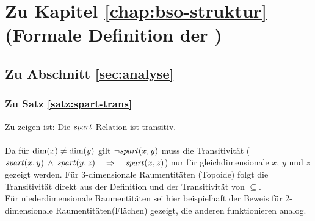 \section{Zu Kapitel \ref{chap:bso-struktur} (Formale Definition der \strukt)}


\subsection{Zu Abschnitt \ref{sec:analyse}}

\subsubsection{Zu Satz \ref{satz:spart-trans}}\label{anh:spart-trans}
Zu zeigen ist: Die $\mathit{spart}$-Relation ist transitiv.\\ \ \\
%
Da für $\text{dim}(x) \neq \text{dim}(y)$ gilt $\neg \mathit{spart}(x,y)$ muss die Transitivität ($\mathit{spart}(x,y) \:\land\: \mathit{spart}(y,z) \quad \Rightarrow \quad \mathit{spart}(x,z)$) nur für gleichdimensionale $x$, $y$ und $z$ gezeigt werden.
Für 3-dimensionale Raumentitäten (Topoide) folgt die Transitivität direkt aus der Definition und der Transitivität von \glqq $\subseteq$\grqq .\\
Für niederdimensionale Raumentitäten sei hier beispielhaft der Beweis für 2-dimensionale Raumentitäten(Flächen) gezeigt, die anderen funktionieren analog. \\ \ \\
%
